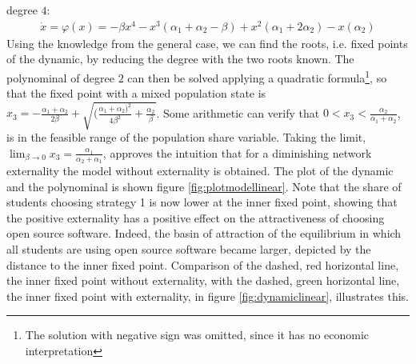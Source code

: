 \documentclass[11pt]{article}
\begin{document}
degree $4$:
\begin{align}
        \dot{x} = \varphi(x) = -\beta x^4 -x^3(\alpha_1 + \alpha_2 
        - \beta ) + x^2 (\alpha_1 + 2 \alpha_2) - x(\alpha_2)
\end{align}
Using the knowledge from the general case, we can find the roots, i.e. fixed
points of the dynamic, by reducing the degree with the two roots known. The
polynominal of degree $2$ can then be solved applying a quadratic formula\footnote{
The solution with negative sign was omitted, since it has no economic 
interpretation}, so that the fixed point with a mixed population state is
$x_3 = -\frac{\alpha_1+\alpha_2}{2 \beta} + 
\sqrt{(\frac{\alpha_1+\alpha_2)^2}{4\beta^2} +\frac{\alpha_2}{\beta}}$. 
Some arithmetic can verify that $0<x_3<\frac{\alpha_2}{\alpha_1+\alpha_2}$, 
is in the feasible range of the population share variable. 
Taking the limit, $\lim_{\beta \rightarrow 0} x_3 = 
\frac{\alpha_1}{\alpha_2+\alpha_1}$, approves the intuition that for a 
diminishing network externality the model without externality is obtained.
The plot of the dynamic and the polynominal is 
shown figure \ref{fig:plotmodellinear}.
Note that the share of students choosing strategy 1 is now lower at the 
inner fixed point, showing that the positive externality has a positive 
effect on the attractiveness of choosing open source software. Indeed,
the basin of attraction of the equilibrium in which all students are using 
open source software became larger, depicted by the distance to the
inner fixed point.
Comparison of the dashed, red horizontal line, the inner fixed point without 
externality, with the dashed, green horizontal line, the inner fixed point 
with externality, in figure \ref{fig:dynamiclinear}, illustrates this. 
\end{document}
